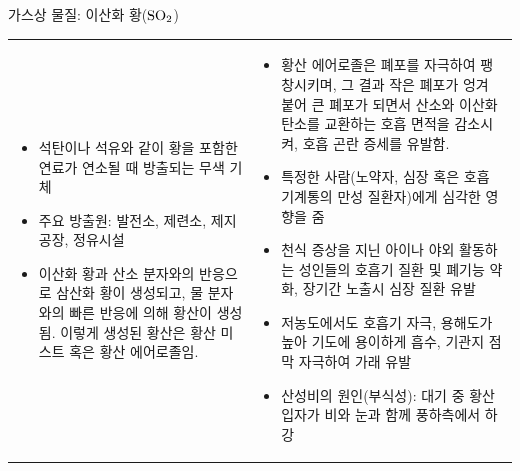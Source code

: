 \begin{frame}[t]{가스상 물질: 이산화 황($\rm{{SO}_{2}}$)}
	\begin{tabular}{ll}
		\begin{minipage}[t]{0.475\textwidth}\scriptsize
			\begin{itemize}
				\item 석탄이나 석유와 같이 황을 포함한 연료가 연소될 때 방출되는 무색 기체
				\item 주요 방출원: 발전소, 제련소, 제지공장, 정유시설
				\item 이산화 황과 산소 분자와의 반응으로 삼산화 황이 생성되고, 물 분자와의 빠른 반응에 의해 황산이 생성됨. 이렇게 생성된 황산은 황산 미스트 혹은 황산 에어로졸임.
			\end{itemize}
		\end{minipage}	
		&
		\begin{minipage}[t]{0.475\textwidth} \scriptsize	
			\begin{itemize}
				\item 황산 에어로졸은 폐포를 자극하여 팽창시키며, 그 결과 작은 폐포가 엉겨 붙어 큰 폐포가 되면서 산소와 이산화 탄소를 교환하는 호흡 면적을 감소시켜, 호흡 곤란 증세를 유발함.
				\item 특정한 사람(노약자, 심장 혹은 호흡 기계통의 만성 질환자)에게 심각한 영향을 줌
				\item 천식 증상을 지닌 아이나 야외 활동하는 성인들의 호흡기 질환 및 폐기능 약화, 장기간 노출시 심장 질환 유발
				\item 저농도에서도 호흡기 자극, 용해도가 높아 기도에 용이하게 흡수, 기관지 점막 자극하여 가래 유발
				\item 산성비의 원인(부식성): 대기 중 황산입자가 비와 눈과 함께 풍하측에서 하강
			\end{itemize}
		\end{minipage}
	\end{tabular}
\end{frame}




